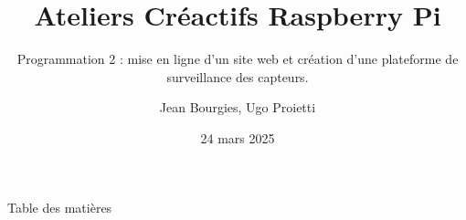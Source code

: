 \documentclass[aspectratio=169,xcolor=dvipsnames]{beamer}
\title{Ateliers Créactifs Raspberry Pi}
\subtitle{Programmation 2 : mise en ligne d'un site web et création d'une plateforme de surveillance des capteurs.}
\author{Jean Bourgies, Ugo Proietti}
\date{24 mars 2025}
\begin{document}
\begin{frame}
    \titlepage
\end{frame}

\begin{frame}{Table des matières}
    \tableofcontents
\end{frame}
\end{document}
